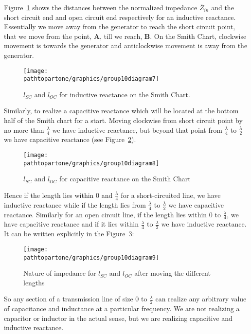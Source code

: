 Figure~\ref{fig:group10diagram7} shows the distances between the normalized impedance $\bar{Z}_{in}$ and the short circuit end and open circuit end respectively for an inductive reactance. Essentially we move away from the generator to reach the short circuit point, that we move from the point, \textbf{A}, till we reach, \textbf{B}. On the Smith Chart, clockwise movement is towards the generator and anticlockwise movement is away from the generator.
\begin{figure}[h]
\centering
\texttt{[image: \\pathtopartone/graphics/group10diagram7]}
\caption{$ l_{SC} $ and $ l_{OC} $ for inductive reactance on the Smith Chart.}
\label{fig:group10diagram7}
\end{figure}

Similarly, to realize a capacitive reactance which will be located at the bottom half of the Smith chart for a start. Moving clockwise from short circuit point by no more than $\frac{\lambda}{4}$ we have inductive reactance, but beyond that point from $\frac{\lambda}{4}$ to $\frac{\lambda}{2}$ we have capacitive reactance (see Figure~\ref{fig:group10diagram9}).
\begin{figure}[h]
\centering
\texttt{[image: \\pathtopartone/graphics/group10diagram8]}
\caption{$ l_{SC} $ and $ l_{OC} $ for capacitive reactance on the Smith Chart}
\label{fig:group10diagram9}
\end{figure}

Hence if the length lies within 0 and $ \frac{\lambda}{4} $ for a short-circuited line, we have inductive reactance while if the length lies from $ \frac{\lambda}{4} $ to $ \frac{\lambda}{2} $ we have capacitive reactance. Similarly for an open circuit line, if the length lies within 0 to $ \frac{\lambda}{4} $, we have capacitive reactance and if it lies within $ \frac{\lambda}{4} $ to $ \frac{\lambda}{2} $ we have inductive reactance. It can be written explicitly in the Figure~\ref{fig:group10diagram10}:
\begin{figure}[h]
\centering
\texttt{[image: \\pathtopartone/graphics/group10diagram9]}
\caption{Nature of impedance for $ l_{SC} $ and $ l_{OC} $ after moving the different lengths}
\label{fig:group10diagram10}
\end{figure}

So any section of a transmission line of size 0 to $\frac{\lambda}{2} $ can realize any arbitrary value of capacitance and inductance at a particular frequency. We are not realizing a capacitor or inductor in the actual sense, but we are realizing capacitive and inductive reactance.

